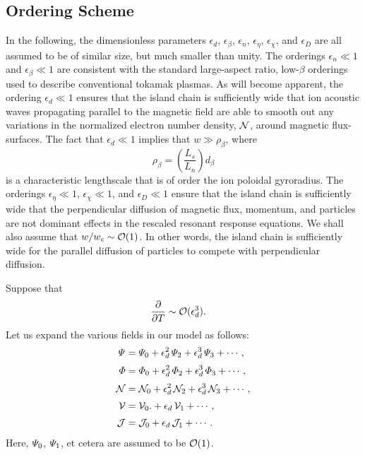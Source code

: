 \documentclass[12pt,prb,aps]{revtex4-1}
\begin{document}
\subsection{Ordering Scheme}
In the following, the dimensionless parameters $\epsilon_d$, $\epsilon_\beta$, $\epsilon_n$, $\epsilon_\eta$, $\epsilon_\chi$,
and $\epsilon_D$ are all assumed to be of similar size, but much smaller than unity. The orderings $\epsilon_n\ll 1$ and $\epsilon_\beta\ll 1$
are consistent with the standard large-aspect ratio, low-$\beta$ orderings used to describe conventional tokamak
plasmas. As will become apparent, the ordering $\epsilon_d\ll 1$ ensures that the island chain is
sufficiently wide that ion acoustic waves propagating parallel to the magnetic field are able to smooth out any
variations in the normalized electron number density, ${\cal N}$, around magnetic flux-surfaces.\cite{scott} The fact that $\epsilon_d\ll 1$ implies that
$w \gg \rho_\beta$,
where
\begin{equation}
\rho_\beta = \left(\frac{L_s}{L_n}\right)d_\beta
\end{equation}
is a characteristic lengthscale that is of order the ion poloidal gyroradius. 
 The orderings $\epsilon_\eta\ll 1$, $\epsilon_\chi\ll 1$, and $\epsilon_D\ll 1$ ensure that the island
chain is sufficiently wide that the perpendicular diffusion of magnetic flux, momentum, and particles are not dominant
effects in the rescaled resonant response equations. We shall also assume that $w/w_c\sim{\cal O}(1)$. In other words, the
island chain is sufficiently wide for the parallel diffusion of particles to compete with perpendicular diffusion.\cite{rff} 

Suppose that 
\begin{align}
\frac{\partial}{\partial T}&\sim {\cal O}(\epsilon_d^3).
\end{align}
Let us expand the various fields in our model as follows:
\begin{align}
{\mit\Psi}&= {\mit\Psi}_0+\epsilon_d^2\,{\mit\Psi}_2+ \epsilon_d^3\,{\mit\Psi}_3 + \cdots,\label{e429}\\[0.5ex]
{\mit\Phi}&= {\mit\Phi}_0+\epsilon_d^2\,{\mit\Phi}_2+ \epsilon_d^3\,{\mit\Phi}_3 + \cdots,\\[0.5ex]
{\cal N}&= {\cal N}_0+\epsilon_d^2\,{\cal N}_2+ \epsilon_d^3\,{\cal N}_3 + \cdots,\label{e431}\\[0.5ex]
{\cal V} & ={\cal V}_0. +\epsilon_d\,{\cal V}_1 +\cdots,\\[0.5ex]
{\cal J} &= {\cal J}_0 + \epsilon_d\,{\cal J}_1 +\cdots. \label{e496}
\end{align}
Here, ${\mit\Psi}_0$, ${\mit\Psi}_1$, et cetera are assumed to be ${\cal O}(1)$. 
\end{document}
